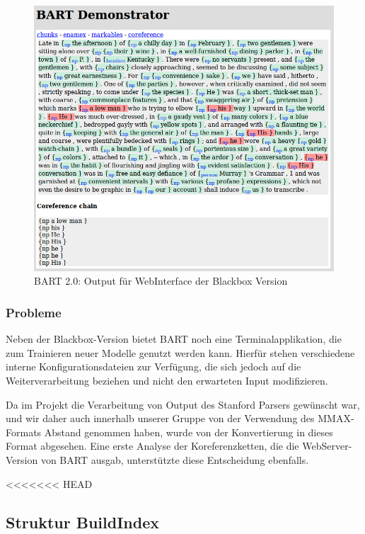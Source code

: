 \begin{figure}[ht]
\begin{center}
\includegraphics[width=12cm]{./img/cle/bart_webUI_output.png}
\caption{BART 2.0: Output für WebInterface der Blackbox Version}
\label{bart_webUI_output}
\end{center}
\end{figure}

\subsubsection{Probleme}

\noindent
Neben der Blackbox-Version bietet BART noch eine Terminalapplikation, 
die zum Trainieren neuer Modelle genutzt werden kann.
Hierfür stehen verschiedene interne Konfigurationsdateien zur Verfügung,
die sich jedoch auf die Weiterverarbeitung beziehen und nicht den erwarteten
Input modifizieren.

Da im Projekt die Verarbeitung von Output des Stanford Parsers gewünscht war,
und wir daher auch innerhalb unserer Gruppe von der Verwendung des MMAX-Formats 
Abstand genommen haben, wurde von der Konvertierung in dieses Format abgesehen.
Eine erste Analyse der Koreferenzketten, die die WebServer-Version von BART ausgab,
unterstützte diese Entscheidung ebenfalls.

<<<<<<< HEAD
\subsection{Struktur BuildIndex} %
 
